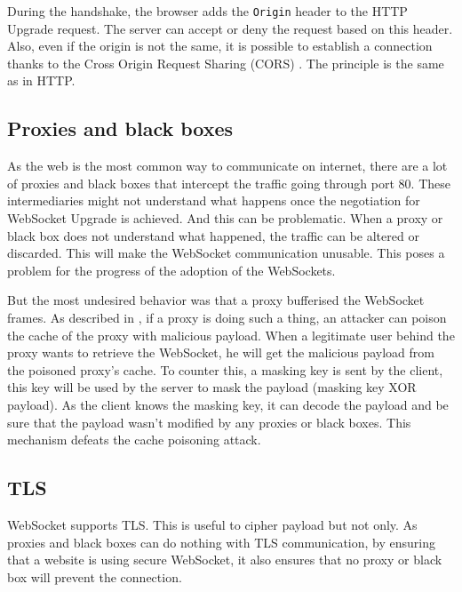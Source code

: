 \documentclass[journal,compsoc]{IEEEtran}
\newcommand{\ttt}[1]{\texttt{#1}}
\newcommand{\ws}{WebSocket}
\begin{document}
During the handshake, the browser adds the \ttt{Origin} header to the HTTP Upgrade request.
The server can accept or deny the request based on this header.
Also, even if the origin is not the same, it is possible to establish a connection thanks to the Cross Origin Request Sharing (CORS) \cite{talkingtoyourself}.
The principle is the same as in HTTP.

\subsection{Proxies and black boxes}
\label{sec:key}
As the web is the most common way to communicate on internet, there are a lot of proxies and black boxes that intercept the traffic going through port 80.
These intermediaries might not understand what happens once the negotiation for \ws{} Upgrade is achieved.
And this can be problematic.
When a proxy or black box does not understand what happened, the traffic can be altered or discarded.
This will make the \ws{} communication unusable.
This poses a problem for the progress of the adoption of the \ws s.

But the most undesired behavior was that a proxy bufferised the \ws{} frames.
As described in \cite{talkingtoyourself}, if a proxy is doing such a thing, an attacker can poison the cache of the proxy with malicious payload.
When a legitimate user behind the proxy wants to retrieve the \ws{}, he will get the malicious payload from the poisoned proxy's cache.
To counter this, a masking key is sent by the client, this key will be used by the server to mask the payload (masking key XOR payload).
As the client knows the masking key, it can decode the payload and be sure that the payload wasn't modified by any proxies or black boxes.
This mechanism defeats the cache poisoning attack.

\subsection{TLS}
\ws{} supports TLS.
This is useful to cipher payload but not only.
As proxies and black boxes can do nothing with TLS communication, by ensuring that a website is using secure \ws{}, it also ensures that no proxy or black box will prevent the connection.
\end{document}
